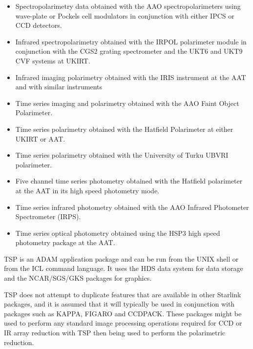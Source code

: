 \documentclass[11pt,twoside]{article}
\renewcommand{\_}{\texttt{\symbol{95}}}
\begin{document}
\begin{itemize}

\item Spectropolarimetry data obtained with the AAO
spectropolarimeters using wave-plate or Pockels cell modulators
in conjunction with either IPCS or CCD detectors.

\item Infrared spectropolarimetry obtained with the IRPOL polarimeter module
in conjunction with the CGS2 grating spectrometer and the UKT6 and UKT9 CVF
systems at UKIRT.

\item Infrared imaging polarimetry obtained with the IRIS instrument at the AAT and with similar instruments

\item Time series imaging and polarimetry obtained with the AAO
Faint Object Polarimeter.

\item Time series polarimetry obtained with the Hatfield Polarimeter
at either UKIRT or AAT.

\item Time series polarimetry obtained with the University of Turku
UBVRI polarimeter.

\item Five channel time series photometry obtained with the Hatfield
polarimeter at the AAT in its high speed photometry mode.

\item Time series infrared photometry obtained with the AAO Infrared
Photometer Spectrometer (IRPS).

\item Time series optical photometry obtained using the HSP3 high speed
photometry package at the AAT.

\end{itemize}

TSP is an ADAM application package and can be run from the UNIX shell or
from the ICL command language.
It uses the HDS data system for data storage and the NCAR/SGS/GKS packages
for graphics.

TSP does not attempt to duplicate features that are available in other Starlink
packages, and it is assumed that it will typically be used in conjunction with packages such as KAPPA, FIGARO and CCDPACK. These packages might be used to perform any standard image processing operations required for CCD or IR array
reduction with TSP then being used to perform the polarimetric reduction.
\end{document}
